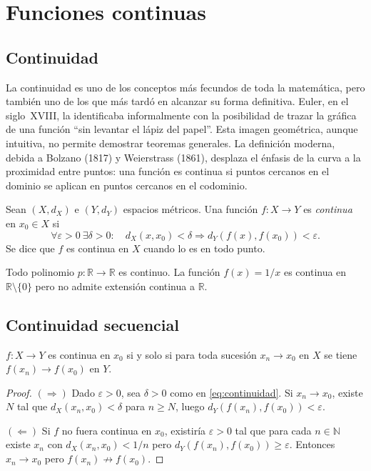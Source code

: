 \chapter{Funciones continuas}
\label{ch:funciones-continuas}

\section{Continuidad}

La continuidad es uno de los conceptos más fecundos de toda la matemática, pero también uno de los que más tardó en alcanzar su forma definitiva. Euler, en el siglo~XVIII, la identificaba informalmente con la posibilidad de trazar la gráfica de una función ``sin levantar el lápiz del papel''. Esta imagen geométrica, aunque intuitiva, no permite demostrar teoremas generales. La definición moderna, debida a Bolzano (1817) y Weierstrass (1861), desplaza el énfasis de la curva a la proximidad entre puntos: una función es continua si puntos cercanos en el dominio se aplican en puntos cercanos en el codominio.

\begin{definition}
\label{def:continuidad}
Sean $(X,d_X)$ e $(Y,d_Y)$ espacios métricos. Una función $f\colon X\to Y$ es \emph{continua} en $x_0\in X$ si
\begin{equation}\label{eq:continuidad}
  \forall\varepsilon>0\ \exists\delta>0:\quad d_X(x,x_0)<\delta\Rightarrow d_Y(f(x),f(x_0))<\varepsilon.
\end{equation}
Se dice que $f$ es continua en $X$ cuando lo es en todo punto.
\end{definition}

\begin{example}
\label{ej:polinomios-continuos}
Todo polinomio $p\colon\mathbb{R}\to\mathbb{R}$ es continuo. La función $f(x)=1/x$ es continua en $\mathbb{R}\setminus\{0\}$ pero no admite extensión continua a $\mathbb{R}$.
\end{example}

\section{Continuidad secuencial}

\begin{theorem}
\label{teo:continuidad-secuencial}
$f\colon X\to Y$ es continua en $x_0$ si y solo si para toda sucesión $x_n\to x_0$ en $X$ se tiene $f(x_n)\to f(x_0)$ en $Y$.
\end{theorem}
\begin{proof}
$(\Rightarrow)$ Dado $\varepsilon>0$, sea $\delta>0$ como en \eqref{eq:continuidad}. Si $x_n\to x_0$, existe $N$ tal que $d_X(x_n,x_0)<\delta$ para $n\geq N$, luego $d_Y(f(x_n),f(x_0))<\varepsilon$.

$(\Leftarrow)$ Si $f$ no fuera continua en $x_0$, existiría $\varepsilon>0$ tal que para cada $n\in\mathbb{N}$ existe $x_n$ con $d_X(x_n,x_0)<1/n$ pero $d_Y(f(x_n),f(x_0))\geq\varepsilon$. Entonces $x_n\to x_0$ pero $f(x_n)\not\to f(x_0)$.
\end{proof}

